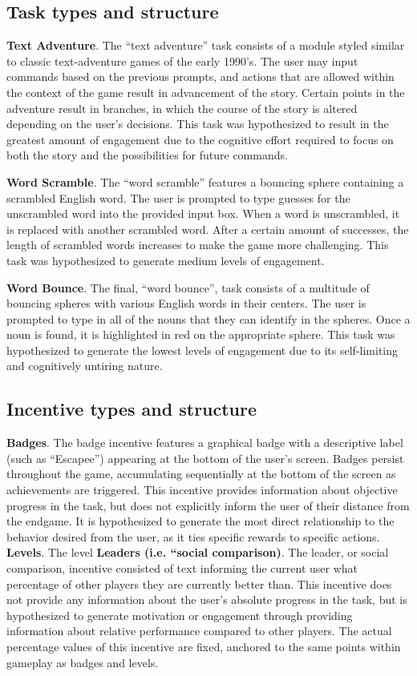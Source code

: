 \subsection{Task types and structure}
{\bf Text Adventure}. The “text adventure” task consists of a module styled similar to classic text-adventure games of the early 1990’s. The user may input commands based on the previous prompts, and actions that are allowed within the context of the game result in advancement of the story. Certain points in the adventure result in branches, in which the course of the story is altered depending on the user’s decisions. This task was hypothesized to result in the greatest amount of engagement due to the cognitive effort required to focus on both the story and the possibilities for future commands.

{\bf Word Scramble}. The “word scramble” features a bouncing sphere containing a scrambled English word. The user is prompted to type guesses for the unscrambled word into the provided input box. When a word is unscrambled, it is replaced with another scrambled word. After a certain amount of successes, the length of scrambled words increases to make the game more challenging. This task was hypothesized to generate medium levels of engagement.

{\bf Word Bounce}. The final, “word bounce”, task consists of a multitude of bouncing spheres with various English words in their centers. The user is prompted to type in all of the nouns that they can identify in the spheres. Once a noun is found, it is highlighted in red on the appropriate sphere. This task was hypothesized to generate the lowest levels of engagement due to its self-limiting and cognitively untiring nature.

\subsection{Incentive types and structure}
{\bf Badges}. The badge incentive features a graphical badge with a descriptive label (such as “Escapee”) appearing at the bottom of the user’s screen. Badges persist throughout the game, accumulating sequentially at the bottom of the screen as achievements are triggered. This incentive provides information about objective progress in the task, but does not explicitly inform the user of their distance from the endgame. It is hypothesized to generate the most direct relationship to the behavior desired from the user, as it ties specific rewards to specific actions.
{\bf Levels}. The level 
{\bf Leaders (i.e. “social comparison)}. The leader, or social comparison, incentive consisted of text informing the current user what percentage of other players they are currently better than. This incentive does not provide any information about the user’s absolute progress in the task, but is hypothesized to generate motivation or engagement through providing information about relative performance compared to other players. The actual percentage values of this incentive are fixed, anchored to the same points within gameplay as badges and levels.


